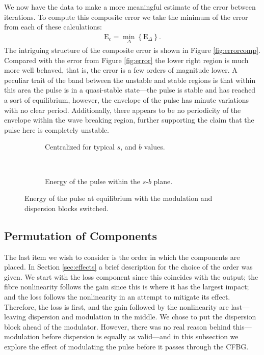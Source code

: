 We now have the data to make a more meaningful estimate of the error between iterations. To compute this composite error we take the minimum of the error from each of these calculations:
\begin{align}
\textrm{E}_c = \min_\Delta \left\{ \textrm{E}_\Delta \right\}.
\label{eq:errorcomp}
\end{align}
The intriguing structure of the composite error is shown in Figure \ref{fig:errorcomp}. Compared with the error from Figure \ref{fig:error} the lower right region is much more well behaved, that is, the error is a few orders of magnitude lower. A peculiar trait of the band between the unstable and stable regions is that within this area the pulse is in a quasi-stable state---the pulse is stable and has reached a sort of equilibrium, however, the envelope of the pulse has minute variations with no clear period. Additionally, there appears to be no periodicity of the envelope within the wave breaking region, further supporting the claim that the pulse here is completely unstable. \\

\begin{figure}[p]
\centering
\begin{subfigure}{\textwidth}

\caption{Centralized for typical $s$, and $b$ values.}
\label{fig:switchzoom}
\end{subfigure} \\
\begin{subfigure}{\textwidth}

\caption{Energy of the pulse within the $s$-$b$ plane.}
\label{fig:switchbig}
\end{subfigure}
\caption{Energy of the pulse at equilibrium with the modulation and dispersion blocks switched.}
\label{fig:switch}
\end{figure}

\subsection{Permutation of Components}
The last item we wish to consider is the order in which the components are placed. In Section \ref{sec:effects} a brief description for the choice of the order was given. We start with the loss component since this coincides with the output; the fibre nonlinearity follows the gain since this is where it has the largest impact; and the loss follows the nonlinearity in an attempt to mitigate its effect. Therefore, the loss is first, and the gain followed by the nonlinearity are last---leaving dispersion and modulation in the middle. We chose to put the dispersion block ahead of the modulator. However, there was no real reason behind this---modulation before dispersion is equally as valid---and in this subsection we explore the effect of modulating the pulse before it passes through the CFBG. \\

